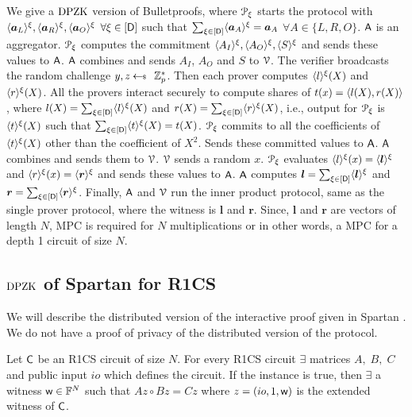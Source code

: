 We give a $\DPZK$ version of Bulletproofs, where $\distprover$ starts the protocol with $\shr{\bm{a}_L}, \shr{\bm{a}_R}, \shr{\bm{a}_O}$ $\forall \xi \in [\Num]$ such that $\sum_{\xi\in [\Num]} \shr{\bm{a}_A} = \bm{a}_A$ $\forall A\in \{L,R,O\} $. $\Ag$ is an aggregator.
$\distprover$ computes the commitment $\shr{A_I}, \shr{A_O}, \shr{S}$ and sends these values to $\Ag$. $\Ag$ combines and sends $A_I$, $A_O$ and $S$ to $\verifier$.
The verifier broadcasts the random challenge $y,z \sample \ZZ^\ast_p$.
Then each prover computes $\shr{l}(X)$ and $\shr{r}(X)$.
All the provers interact securely to compute shares of $t(x) = \innp{l(X)}{r(X)}$, where $l(X)= \sum_{\xi\in [\Num]} \shr{l}(X)$ and $r(X) = \sum_{\xi\in [\Num]} \shr{r}(X)$, i.e., output for $\distprover$ is $\shr{t}(X)$ such that $\sum_{\xi\in [\Num]} \shr{t}(X) = t(X)$.
$\distprover$ commits to all the coefficients of $\shr{t}(X)$ other than the coefficient of $X^2$. Sends these committed values to $\Ag$. $\Ag$ combines and sends them to $\verifier$.
$\verifier$ sends a random $x$. $\distprover$ evaluates $\shr{l}(x) = \shr{\bm{l}}$ and $\shr{r}(x) = \shr{\bm{r}}$ and sends these values to $\Ag$. $\Ag$ computes $\bm{l} = \sum_{\xi\in [\Num]} \shr{\bm{l}}$ and $\bm{r} = \sum_{\xi\in [\Num]} \shr{\bm{r}}$.
Finally, $\Ag$ and $\verifier$ run the inner product protocol, same as the single prover protocol, where the witness is $\bm{l}$ and $\bm{r}$.
Since, $\bm{l}$ and $\bm{r}$ are vectors of length $N$, MPC is required for $N$ multiplications or in other words, a MPC for a depth 1 circuit of size $N$.

\subsection{$\DPZK$ of Spartan for R1CS}\label{app:SpartanDPZK}
We will describe the distributed version of the interactive proof given in Spartan \cite{spartan}. We do not have a proof of privacy of the distributed version of the protocol.

Let $\C$ be an R1CS circuit of size $N$. For every R1CS circuit $\exists$ matrices $A,\;B,\;C$ and public input $io$ which defines the circuit. If the instance is true, then $\exists$ a witness $\wit\in\FF^N$ such that $A z \circ B z = C z$ where $z = (io,1,\wit)$ is the extended witness of $\C$.

